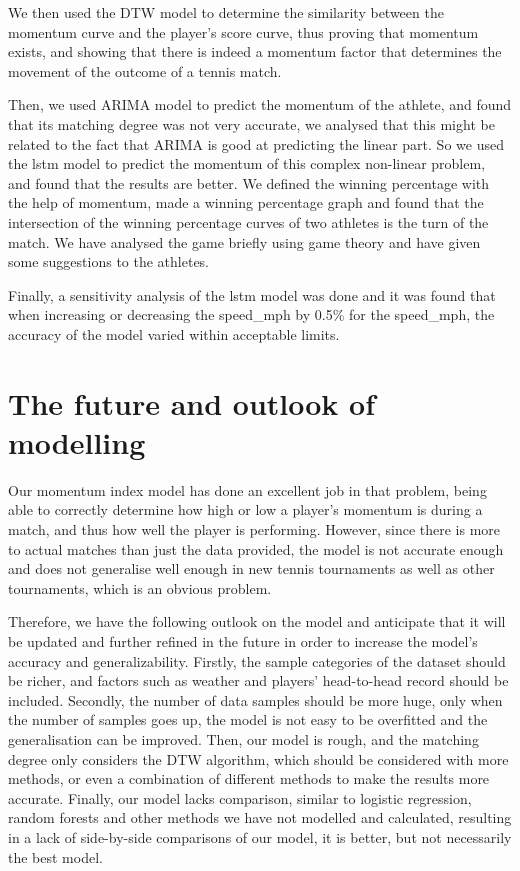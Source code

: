 \documentclass[12pt]{article}  %
\begin{document}
We then used the DTW model to determine the similarity between the momentum curve and the player's score curve, thus proving that momentum exists, and showing that there is indeed a momentum factor that determines the movement of the outcome of a tennis match.

Then, we used ARIMA model to predict the momentum of the athlete, and found that its matching degree was not very accurate, we analysed that this might be related to the fact that ARIMA is good at predicting the linear part. So we used the lstm model to predict the momentum of this complex non-linear problem, and found that the results are better. We defined the winning percentage with the help of momentum, made a winning percentage graph and found that the intersection of the winning percentage curves of two athletes is the turn of the match. We have analysed the game briefly using game theory and have given some suggestions to the athletes.

Finally, a sensitivity analysis of the lstm model was done and it was found that when increasing or decreasing the speed\_mph by 0.5\% for the speed\_mph, the accuracy of the model varied within acceptable limits.

\section{The future and outlook of modelling}

Our momentum index model has done an excellent job in that problem, being able to correctly determine how high or low a player's momentum is during a match, and thus how well the player is performing. However, since there is more to actual matches than just the data provided, the model is not accurate enough and does not generalise well enough in new tennis tournaments as well as other tournaments, which is an obvious problem.

Therefore, we have the following outlook on the model and anticipate that it will be updated and further refined in the future in order to increase the model's accuracy and generalizability. Firstly, the sample categories of the dataset should be richer, and factors such as weather and players' head-to-head record should be included. Secondly, the number of data samples should be more huge, only when the number of samples goes up, the model is not easy to be overfitted and the generalisation can be improved. Then, our model is rough, and the matching degree only considers the DTW algorithm, which should be considered with more methods, or even a combination of different methods to make the results more accurate. Finally, our model lacks comparison, similar to logistic regression, random forests and other methods we have not modelled and calculated, resulting in a lack of side-by-side comparisons of our model, it is better, but not necessarily the best model.
\end{document}
